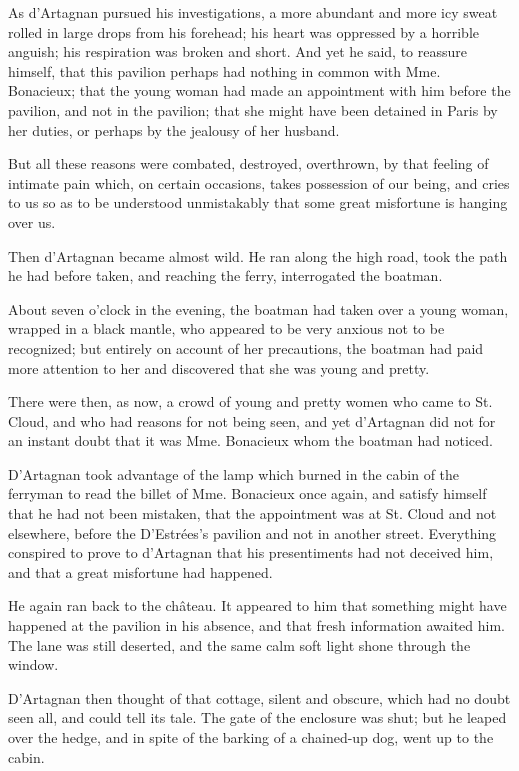 As d'Artagnan pursued his investigations, a more abundant and more icy sweat rolled in large drops from his forehead; his heart was oppressed by a horrible anguish; his respiration was broken and short. And yet he said, to reassure himself, that this pavilion perhaps had nothing in common with Mme. Bonacieux; that the young woman had made an appointment with him before the pavilion, and not in the pavilion; that she might have been detained in Paris by her duties, or perhaps by the jealousy of her husband. 

But all these reasons were combated, destroyed, overthrown, by that feeling of intimate pain which, on certain occasions, takes possession of our being, and cries to us so as to be understood unmistakably that some great misfortune is hanging over us. 

Then d'Artagnan became almost wild. He ran along the high road, took the path he had before taken, and reaching the ferry, interrogated the boatman. 

About seven o'clock in the evening, the boatman had taken over a young woman, wrapped in a black mantle, who appeared to be very anxious not to be recognized; but entirely on account of her precautions, the boatman had paid more attention to her and discovered that she was young and pretty. 

There were then, as now, a crowd of young and pretty women who came to St. Cloud, and who had reasons for not being seen, and yet d'Artagnan did not for an instant doubt that it was Mme. Bonacieux whom the boatman had noticed. 

D'Artagnan took advantage of the lamp which burned in the cabin of the ferryman to read the billet of Mme. Bonacieux once again, and satisfy himself that he had not been mistaken, that the appointment was at St. Cloud and not elsewhere, before the D'Estrées's pavilion and not in another street. Everything conspired to prove to d'Artagnan that his presentiments had not deceived him, and that a great misfortune had happened. 

He again ran back to the château. It appeared to him that something might have happened at the pavilion in his absence, and that fresh information awaited him. The lane was still deserted, and the same calm soft light shone through the window. 

D'Artagnan then thought of that cottage, silent and obscure, which had no doubt seen all, and could tell its tale. The gate of the enclosure was shut; but he leaped over the hedge, and in spite of the barking of a chained-up dog, went up to the cabin. 

